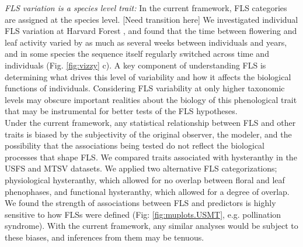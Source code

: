 \documentclass{article}
\begin{document}
\emph{FLS variation is a species level trait:}
In the current framework, FLS categories are assigned at the species level. [Need transition here] We investigated individual FLS variation at Harvard Forest \citep{OKeefe2015}, and found that the time between flowering and leaf activity varied by as much as several weeks between individuals and years, and in some species the sequence itself regularly switched across time and individuals  (Fig. \ref{fig:vizzy} c). A key component of understanding FLS is determining what drives this level of variability and how it affects the biological functions of individuals. Considering FLS variability at only higher taxonomic levels may obscure important realities about the biology of this phenological trait that may be instrumental for better tests of the FLS hypotheses.\\

\noindent Under the current framework, any statistical relationship between FLS and other traits is biased by the subjectivity of the original observer, the modeler, and the possibility that the associations being tested do not reflect the biological processes that shape FLS. We compared traits associated with hysteranthy in the USFS and MTSV datasets. We applied two alternative FLS categorizations; physiological hysteranthy, which allowed for no overlap between floral and leaf phenophases, and functional hysteranthy, which allowed for a degree of overlap. We found the strength of associations between FLS and predictors is highly sensitive to how FLSs were defined (Fig: \ref{fig:muplots.USMT}, e.g. pollination syndrome). With the current framework, any similar analyses would be subject to these biases, and inferences from them may be tenuous. \\
\end{document}
